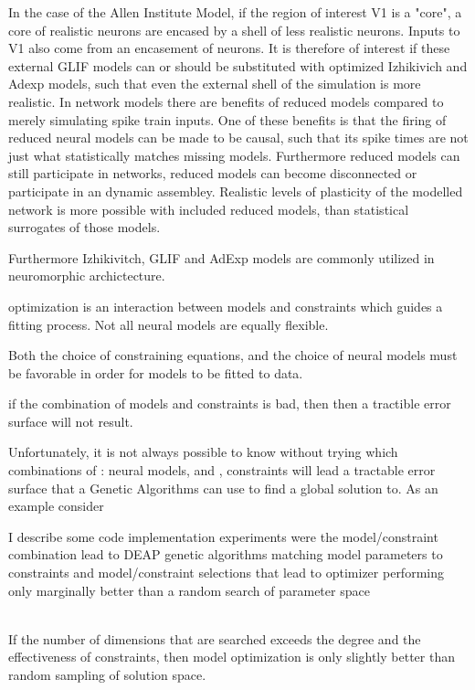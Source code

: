 \documentclass{article}
\begin{document}
In the case of the Allen Institute Model, if the region of interest V1 is a "core", a core of realistic neurons are encased by a shell of less realistic neurons. Inputs to V1 also come from an encasement of neurons. It is therefore of interest if these external GLIF models can or should be substituted with optimized Izhikivich and Adexp models, such that even the external shell of the simulation is more realistic. In network models there are benefits of reduced models compared to merely simulating spike train inputs. One of these benefits is that the firing of reduced neural models can be made to be causal, such that its spike times are not just what statistically matches missing models. Furthermore reduced models can still participate in networks, reduced models can become disconnected or participate in an dynamic assembley. Realistic levels of plasticity of the modelled network is more possible with included reduced models, than statistical surrogates of those models.

Furthermore Izhikivitch, GLIF and AdExp models are commonly utilized in neuromorphic archictecture.

\subitem optimization is an interaction between models and constraints which guides a fitting process. Not all neural models are equally flexible.  
\item  Both the choice of constraining equations, and the choice of neural models must be favorable in order for models to be fitted to data.
\item 
\subitem if the combination of models and constraints is bad, then then a tractible error surface will not result.  

\subsubitem Unfortunately, it is not always possible to know without trying which combinations of \subitem[A]: neural models, and \subitem[B], constraints will lead a tractable error surface that a Genetic Algorithms can use to find a global solution to. As an example consider  

I describe some code implementation experiments were the model/constraint combination lead to DEAP genetic algorithms matching model parameters to constraints and model/constraint selections that lead to optimizer performing only marginally better than a random search of parameter space\\
\\
\item If the number of dimensions that are searched exceeds the degree and the effectiveness of constraints, then model optimization is only slightly better than random sampling of solution space.
\end{document}
